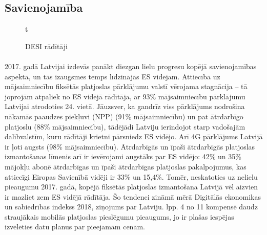 \subsection{Savienojamība}
\begin{figure}[ht]
    \label{att:desi_savienojamiba}t
    \caption{DESI rādītāji}
\end{figure}
\paragraph{}
2017. gadā Latvijai izdevās panākt diezgan lielu progresu kopējā savienojamības
aspektā, un tās izaugsmes temps līdzinājās ES vidējam. Attiecībā uz mājsaimniecību
fiksētās platjoslas pārklājumu valstī vērojama stagnācija – tā joprojām atpaliek no ES
vidējā rādītāja, ar 93\% mājsaimniecību pārklājumu Latvijai atrodoties 24. vietā.
Jāuzsver, ka gandrīz viss pārklājums nodrošina nākamās paaudzes piekļuvi (NPP)
(91\% mājsaimniecību) un pat ātrdarbīgo platjoslu (88\% mājsaimniecību), tādējādi
Latviju ierindojot starp vadošajām dalībvalstīm, kuru rādītāji krietni pārsniedz ES
vidējo. Arī 4G pārklājums Latvijā ir ļoti augsts (98\% mājsaimniecību). Ātrdarbīgās un
īpaši ātrdarbīgās platjoslas izmantošanas līmenis arī ir ievērojami augstāks par ES
vidējo: 42\% un 35\% mājokļu abonē ātrdarbīgas un īpaši ātrdarbīgas platjoslas
pakalpojumus, kas attiecīgi Eiropas Savienībā vidēji ir 33\% un 15,4\%. Tomēr,
neskatoties uz nelielu pieaugumu 2017. gadā, kopējā fiksētās platjoslas izmantošana
Latvijā vēl aizvien ir mazliet zem ES vidējā rādītāja. Šo tendenci zināmā mērā 
Digitālās ekonomikas un sabiedrības indekss 2018, ziņojums par Latviju. lpp. 4 no 11
kompensē daudz straujākais mobilās platjoslas pieslēgumu pieaugums, jo ir plašas
iespējas izvēlēties datu plānus par pieejamām cenām.
